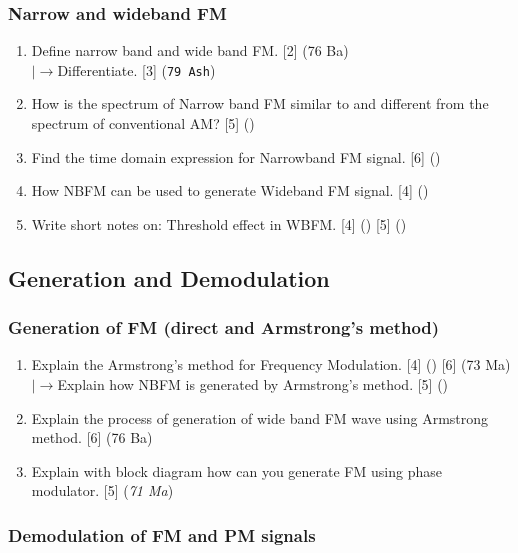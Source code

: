 \documentclass[12pt]{article}
\newcommand{\lb}{\\$\left|\rightarrow\right.$}
\begin{document}
    \subsubsection{Narrow and wideband FM}
      \begin{enumerate}
        \item Define narrow band and wide band FM. \hfill [2] (76 Ba)
          \lb Differentiate. \hfill [3] (\texttt{79 Ash})

        \item How is the spectrum of Narrow band FM similar to and different from the spectrum of conventional AM? \hfill [5] ()

        \item Find the time domain expression for Narrowband FM signal. \hfill [6] ()

        \item How NBFM can be used to generate Wideband FM signal. \hfill [4] ()
        
        \item Write short notes on: Threshold effect in WBFM. \hfill [4] () [5] ()
      \end{enumerate}

  \subsection{Generation and Demodulation}
    \subsubsection{Generation of FM (direct and Armstrong's method)}
      \begin{enumerate}
        \item Explain the Armstrong's method for Frequency Modulation. \hfill [4] () [6] (73 Ma)
        \lb Explain how NBFM is generated by Armstrong's method. \hfill [5] ()

        \item Explain the process of generation of wide band FM wave using Armstrong method. \hfill [6] (76 Ba)

        \item Explain with block diagram how can you generate FM using phase modulator. \hfill [5] (\textit{71 Ma})
      \end{enumerate}

    \subsubsection{Demodulation of FM and PM signals}
\end{document}
